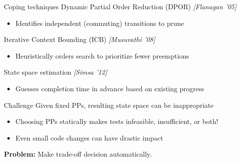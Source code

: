 \documentclass[xcolor=dvipsnames]{beamer}
\begin{document}
\begin{frame}{Coping techniques}
	Dynamic Partial Order Reduction (DPOR) {\em [Flanagan '05]}
	\begin{itemize}
		\item Identifies independent (commuting) transitions to prune
	\end{itemize}
	\linegap

	Iterative Context Bounding (ICB) {\em [Musuvathi '08]}
	\begin{itemize}
		\item Heuristically orders search to prioritize fewer preemptions
	\end{itemize}
	\linegap

	State space estimation {\em [Simsa '12]}
	\begin{itemize}
		\item Guesses completion time in advance based on existing progress
	\end{itemize}

\end{frame}

\begin{frame}{Challenge}
	Given fixed PPs, resulting state space can be inappropriate
	\begin{itemize}
		\item Choosing PPs statically makes tests infeasible, insufficient, or both!
		\item Even small code changes can have drastic impact
	\end{itemize}
	\linegap

	{\bf Problem:} Make trade-off decision automatically.
\end{frame}



\end{document}
